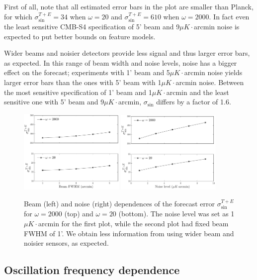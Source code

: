 First of all, note that all estimated error bars in the plot are smaller than Planck, for which $\sigma_{\sin}^{T+E}=34$ when $\omega=20$ and $\sigma_{\sin}^{T+E}=610$ when $\omega=2000$. In fact even the least sensitive CMB-S4 specification of 5' beam and 9$\mu K\cdot$arcmin noise is expected to put better bounds on feature models.

Wider beams and noisier detectors provide less signal and thus larger error bars, as expected. In this range of beam width and noise levels, noise has a bigger effect on the forecast; experiments with 1' beam and 5$\mu K\cdot$arcmin noise yields larger error bars than the ones with 5' beam with 1$\mu K\cdot$arcmin noise. Between the most sensitive specification of 1' beam and 1$\mu K\cdot$arcmin and the least sensitive one with 5' beam and 9$\mu K\cdot$arcmin, $\sigma_{\sin}$ differs by a factor of 1.6.


\begin{figure}[ht]
	\includegraphics[width=0.45\textwidth]{beam_dependence.pdf}
	\includegraphics[width=0.45\textwidth]{noise_dependence.pdf}
	\caption{Beam (left) and noise (right) dependences of the forecast error $\sigma_{\sin}^{T+E}$ for $\omega=2000$ (top) and $\omega=20$ (bottom). The noise level was set as 1$\mu K \cdot$arcmin for the first plot, while the second plot had fixed beam FWHM of 1'. We obtain less information from using wider beam and noisier sensors, as expected.}
	\label{forecast beam and noise dependence}
\end{figure}

\subsection{Oscillation frequency dependence}

